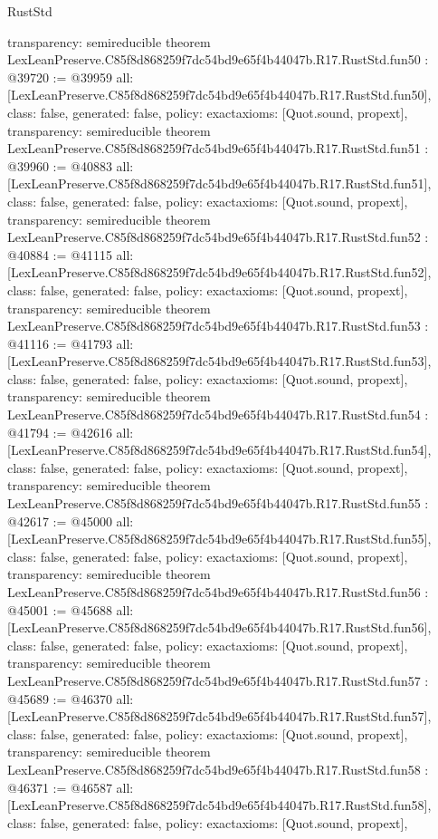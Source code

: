 \begin{lexlean}{RustStd}
\begin{coremodule}
{  transparency: semireducible
}
theorem LexLeanPreserve.C85f8d868259f7dc54bd9e65f4b44047b.R17.RustStd.fun50 : @39720 := @39959 {
  all: [LexLeanPreserve.C85f8d868259f7dc54bd9e65f4b44047b.R17.RustStd.fun50],
  class: false,
  generated: false,
  policy: exact{axioms: [Quot.sound, propext]},
  transparency: semireducible
}
theorem LexLeanPreserve.C85f8d868259f7dc54bd9e65f4b44047b.R17.RustStd.fun51 : @39960 := @40883 {
  all: [LexLeanPreserve.C85f8d868259f7dc54bd9e65f4b44047b.R17.RustStd.fun51],
  class: false,
  generated: false,
  policy: exact{axioms: [Quot.sound, propext]},
  transparency: semireducible
}
theorem LexLeanPreserve.C85f8d868259f7dc54bd9e65f4b44047b.R17.RustStd.fun52 : @40884 := @41115 {
  all: [LexLeanPreserve.C85f8d868259f7dc54bd9e65f4b44047b.R17.RustStd.fun52],
  class: false,
  generated: false,
  policy: exact{axioms: [Quot.sound, propext]},
  transparency: semireducible
}
theorem LexLeanPreserve.C85f8d868259f7dc54bd9e65f4b44047b.R17.RustStd.fun53 : @41116 := @41793 {
  all: [LexLeanPreserve.C85f8d868259f7dc54bd9e65f4b44047b.R17.RustStd.fun53],
  class: false,
  generated: false,
  policy: exact{axioms: [Quot.sound, propext]},
  transparency: semireducible
}
theorem LexLeanPreserve.C85f8d868259f7dc54bd9e65f4b44047b.R17.RustStd.fun54 : @41794 := @42616 {
  all: [LexLeanPreserve.C85f8d868259f7dc54bd9e65f4b44047b.R17.RustStd.fun54],
  class: false,
  generated: false,
  policy: exact{axioms: [Quot.sound, propext]},
  transparency: semireducible
}
theorem LexLeanPreserve.C85f8d868259f7dc54bd9e65f4b44047b.R17.RustStd.fun55 : @42617 := @45000 {
  all: [LexLeanPreserve.C85f8d868259f7dc54bd9e65f4b44047b.R17.RustStd.fun55],
  class: false,
  generated: false,
  policy: exact{axioms: [Quot.sound, propext]},
  transparency: semireducible
}
theorem LexLeanPreserve.C85f8d868259f7dc54bd9e65f4b44047b.R17.RustStd.fun56 : @45001 := @45688 {
  all: [LexLeanPreserve.C85f8d868259f7dc54bd9e65f4b44047b.R17.RustStd.fun56],
  class: false,
  generated: false,
  policy: exact{axioms: [Quot.sound, propext]},
  transparency: semireducible
}
theorem LexLeanPreserve.C85f8d868259f7dc54bd9e65f4b44047b.R17.RustStd.fun57 : @45689 := @46370 {
  all: [LexLeanPreserve.C85f8d868259f7dc54bd9e65f4b44047b.R17.RustStd.fun57],
  class: false,
  generated: false,
  policy: exact{axioms: [Quot.sound, propext]},
  transparency: semireducible
}
theorem LexLeanPreserve.C85f8d868259f7dc54bd9e65f4b44047b.R17.RustStd.fun58 : @46371 := @46587 {
  all: [LexLeanPreserve.C85f8d868259f7dc54bd9e65f4b44047b.R17.RustStd.fun58],
  class: false,
  generated: false,
  policy: exact{axioms: [Quot.sound, propext]},
}
\end{coremodule}
\end{lexlean}
